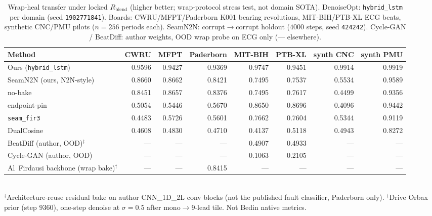 \begin{table}[htbp]
  \centering
  \caption{Wrap-heal transfer under locked $R_{\mathrm{blend}}$ (higher better; wrap-protocol stress test, not domain SOTA).
    DenoiseOpt: \texttt{hybrid\_lstm} per domain (seed \texttt{1902771841}).
    Boards: CWRU/MFPT/Paderborn K001 bearing revolutions, MIT-BIH/PTB-XL ECG beats, synthetic CNC/PMU pilots
    ($n{=}256$ periods each). SeamN2N: corrupt$\to$corrupt holdout ($4000$ steps, seed \texttt{424242}).
    Cycle-GAN / BeatDiff: author weights, OOD wrap probe on ECG only (--- elsewhere).}
  \label{tab:transfer-main}
  \setlength{\tabcolsep}{2.2pt}
  \begin{adjustbox}{max width=\textwidth}
\begin{tabular}{@{}lrrrrrrr@{}}
    \toprule
    Method & CWRU & MFPT & Paderborn & MIT-BIH & PTB-XL & synth CNC & synth PMU \\
    \midrule
    Ours (\texttt{hybrid\_lstm}) & 0.9596 & 0.9427 & 0.9369 & 0.9747 & 0.9451 & 0.9914 & 0.9919 \\
    SeamN2N (ours, N2N-style) & 0.8660 & 0.8662 & 0.8421 & 0.7495 & 0.7537 & 0.5534 & 0.9589 \\
    no-bake & 0.8451 & 0.8657 & 0.8376 & 0.7495 & 0.7617 & 0.4499 & 0.9356 \\
    endpoint-pin & 0.5054 & 0.5446 & 0.5670 & 0.8650 & 0.8696 & 0.4096 & 0.9442 \\
    \texttt{seam\_fir3} & 0.4483 & 0.5726 & 0.5601 & 0.7662 & 0.7604 & 0.5344 & 0.9119 \\
    DualCosine & 0.4608 & 0.4830 & 0.4710 & 0.4137 & 0.5118 & 0.4943 & 0.8272 \\
    BeatDiff (author, OOD)$^\ddagger$ & --- & --- & --- & 0.4907 & 0.4933 & --- & --- \\
    Cycle-GAN (author, OOD) & --- & --- & --- & 0.1063 & 0.2105 & --- & --- \\
    Al~Firdausi backbone (wrap bake)$^\dagger$ & --- & --- & 0.8415 & --- & --- & --- & --- \\
    \bottomrule
  \end{tabular}
\end{adjustbox}\\[0.35em]
  {\footnotesize $^\dagger$Architecture-reuse residual bake on author CNN\_1D\_2L conv blocks (not the published fault classifier, Paderborn only).
    $^\ddagger$Drive Orbax prior (step $9360$), one-step denoise at $\sigma{=}0.5$ after mono$\to$9-lead tile. Not Bedin native metrics.}
\end{table}

